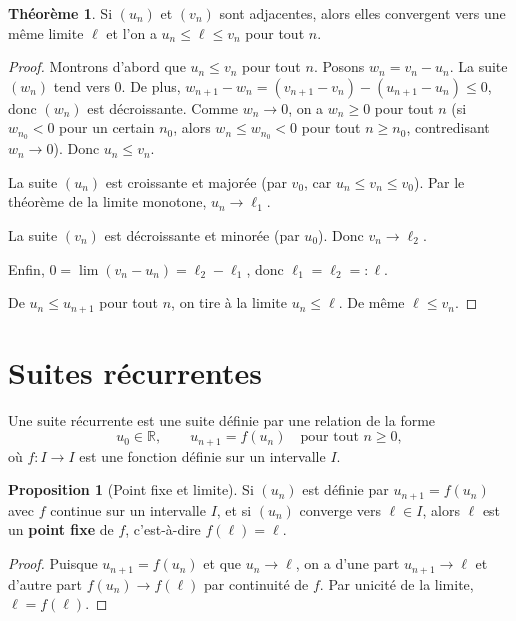 \documentclass[12pt,a4paper,openany]{book}
\theoremstyle{definition}
\newtheorem{theoreme}{Théorème}[chapter]
\newtheorem{proposition}{Proposition}[chapter]
\newcommand{\R}{\mathbb{R}}
\begin{document}
\begin{theoreme}\label{thm:suites-adjacentes}
  Si $(u_n)$ et $(v_n)$ sont adjacentes, alors elles convergent vers une même limite
  $\ell$ et l'on a $u_n \leq \ell \leq v_n$ pour tout $n$.
\end{theoreme}

\begin{proof}
  Montrons d'abord que $u_n \leq v_n$ pour tout $n$. Posons $w_n = v_n - u_n$.
  La suite $(w_n)$ tend vers $0$. De plus, $w_{n+1} - w_n = (v_{n+1} - v_n) - (u_{n+1} - u_n) \leq 0$,
  donc $(w_n)$ est décroissante. Comme $w_n \to 0$, on a $w_n \geq 0$ pour tout $n$
  (si $w_{n_0} < 0$ pour un certain $n_0$, alors $w_n \leq w_{n_0} < 0$ pour tout $n \geq n_0$,
  contredisant $w_n \to 0$). Donc $u_n \leq v_n$.

  La suite $(u_n)$ est croissante et majorée (par $v_0$, car $u_n \leq v_n \leq v_0$).
  Par le théorème de la limite monotone, $u_n \to \ell_1$.

  La suite $(v_n)$ est décroissante et minorée (par $u_0$). Donc $v_n \to \ell_2$.

  Enfin, $0 = \lim(v_n - u_n) = \ell_2 - \ell_1$, donc $\ell_1 = \ell_2 =: \ell$.

  De $u_n \leq u_{n+1}$ pour tout $n$, on tire à la limite $u_n \leq \ell$.
  De même $\ell \leq v_n$.
\end{proof}

\section{Suites récurrentes}\label{sec:suites:recurrentes}

Une suite récurrente est une suite définie par une relation de la forme
\[
  u_0 \in \R, \qquad u_{n+1} = f(u_n) \quad \text{pour tout } n \geq 0,
\]
où $f : I \to I$ est une fonction définie sur un intervalle $I$.

\begin{proposition}[Point fixe et limite]\label{prop:pt-fixe-limite}
  Si $(u_n)$ est définie par $u_{n+1} = f(u_n)$ avec $f$ continue sur un intervalle $I$,
  et si $(u_n)$ converge vers $\ell \in I$, alors $\ell$ est un \textbf{point fixe}
  de $f$, c'est-à-dire $f(\ell) = \ell$.
\end{proposition}

\begin{proof}
  Puisque $u_{n+1} = f(u_n)$ et que $u_n \to \ell$, on a d'une part $u_{n+1} \to \ell$
  et d'autre part $f(u_n) \to f(\ell)$ par continuité de $f$. Par unicité de la limite,
  $\ell = f(\ell)$.
\end{proof}
\end{document}
